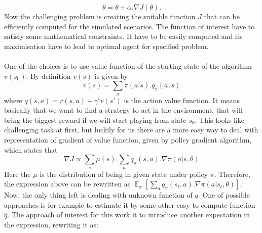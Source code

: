 \documentclass{article}
\DeclareMathOperator{\E}{\mathbb{E}}
\begin{document}
$$
\theta = \theta + \alpha . \nabla J(\theta).
$$
Now the challenging problem is creating the suitable function $J$ that can be efficiently computed for the simulated scenarios. The function of interest have to satisfy some mathematical constraints. It have to be easily computed and its maximisation have to lead to optimal agent for specified problem. \\ \\
One of the choices is to use value function of the starting state of the algorithm $v(s_0)$. By definition $v(s)$ is given by
$$
v(s) = \sum_a \pi(a |s) .q_{\pi}(a, s)
$$
where $q(s, a) = r(s, a) + \gamma^i v(s')$ is the action value function. It means basically that we want to find a strategy to act in the environment, that will bring the biggest reward if we will start playing from state $s_0$. This looks like challenging task at first, but luckily for us there are a more easy way to deal with representation of gradient of value function, given by policy gradient algorithm, which states that
$$
\nabla J \propto \sum_s \mu(s) .\sum_a q_\pi (s, a) .\nabla \pi(a |s, \theta)
$$
Here the $\mu$ is the distribution of being in given state under policy $\pi$. Therefore, the expression above can be rewritten as $\E_\pi \left[\sum_a q_\pi (s_t, a) .\nabla \pi(a |s_t, \theta)\right]$. Now, the only thing left is dealing with unknown function of $q$. One of possible approaches is for example to estimate it by some other easy to compute function $\hat{q}$. The approach of interest for this work it to introduce another expectation in the expression, rewriting it as:
\end{document}
